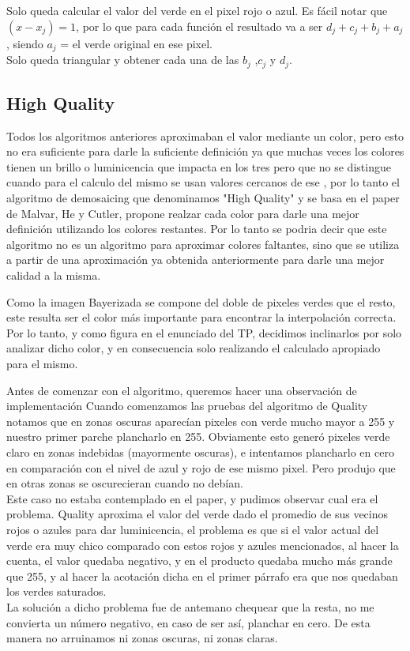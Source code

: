 Solo queda calcular el valor del verde en el pixel rojo o azul.
Es fácil notar que $(x-x_j) = 1$, por lo que para cada función el resultado va a ser $d_j+c_j+b_j+a_j$, siendo $a_j$ = el verde original en ese pixel.\\
Solo queda triangular y obtener cada una de las $b_j$ ,$c_j$ y $d_j$.


\subsection{High Quality}

Todos los algoritmos anteriores aproximaban el valor mediante un color, pero esto no era suficiente para darle la suficiente definición ya que muchas veces los colores tienen un brillo o luminicencia que impacta en los tres pero que no se distingue cuando para el calculo del mismo se usan valores cercanos de ese , por lo tanto el algoritmo de demosaicing que denominamos "High Quality" y se basa en el paper de Malvar, He y Cutler, propone realzar cada color para darle una mejor definición utilizando los colores restantes. Por lo tanto se podria decir que este algoritmo no es un algoritmo para aproximar colores faltantes, sino que se utiliza a partir de una aproximación ya obtenida anteriormente para darle una mejor calidad a la misma.

Como la imagen Bayerizada se compone del doble de pixeles verdes que el resto, este resulta ser el color más importante para encontrar la interpolación correcta. Por lo tanto, y como figura en el enunciado del TP, decidimos inclinarlos por solo analizar dicho color, y en consecuencia solo realizando el calculado apropiado para el mismo.

Antes de comenzar con el algoritmo, queremos hacer una observación de implementación
Cuando comenzamos las pruebas del algoritmo de Quality notamos que en zonas oscuras aparecían pixeles con verde mucho mayor a 255 y nuestro primer parche plancharlo en 255. Obviamente esto generó pixeles verde claro en zonas indebidas (mayormente oscuras), e intentamos plancharlo en cero en comparación con el nivel de azul y rojo de ese mismo pixel. Pero produjo que en otras zonas se oscurecieran cuando no debían.\\
Este caso no estaba contemplado en el paper, y pudimos observar cual era el problema. Quality aproxima el valor del verde dado el promedio de sus vecinos rojos o azules para dar luminicencia, el problema es que si el valor actual del verde era muy chico comparado con estos rojos y azules mencionados, al hacer la cuenta, el valor quedaba negativo, y en el producto quedaba mucho más grande que 255, y al hacer la acotación dicha en el primer párrafo era que nos quedaban los verdes saturados.\\
La solución a dicho problema fue de antemano chequear que la resta, no me convierta un número negativo, en caso de ser así, planchar en cero. De esta manera no arruinamos ni zonas oscuras, ni zonas claras.

